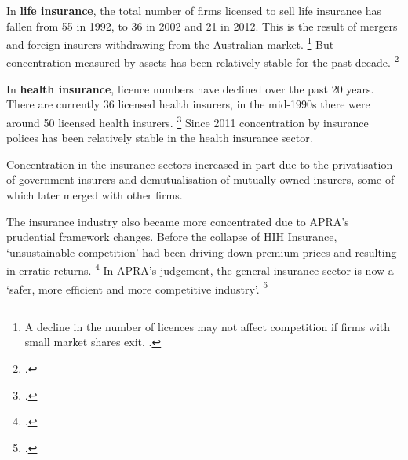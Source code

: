 In \textbf{life insurance}, the total number of firms licensed to sell life insurance has fallen from 55 in 1992, to 36 in 2002 and 21 in 2012. This is the result of mergers and foreign insurers withdrawing from the Australian market.%
\footnote{A decline in the number of licences may not affect competition if firms with small market shares exit. \textcite{APRA_insight_insurance}.} But concentration measured by assets has been relatively stable for the past decade.%
\footcite{APRA_PC_Sub_2017} 

In \textbf{health insurance}, licence numbers have declined over the past 20 years. There are currently 36 licensed health insurers, in the mid-1990s there were around 50 licensed health insurers.%
\footcites{PHIAC-competition-health}{APRA_PC_Sub_2017} Since 2011 concentration by insurance polices has been relatively stable in the health insurance sector.

Concentration in the insurance sectors increased in part due to the privatisation of government insurers and demutualisation of mutually owned insurers, some of which later merged with other firms.

The insurance industry also became more concentrated due to APRA's prudential framework changes.
Before the collapse of HIH Insurance, `unsustainable competition' had been driving down premium prices and resulting in erratic returns.%
  \footcite[][23--24]{APRA_FSI_2014}
In APRA's judgement, the general insurance sector is now a `safer, more efficient and more competitive industry'.%
  \footcite[][23]{APRA_FSI_2014}  




